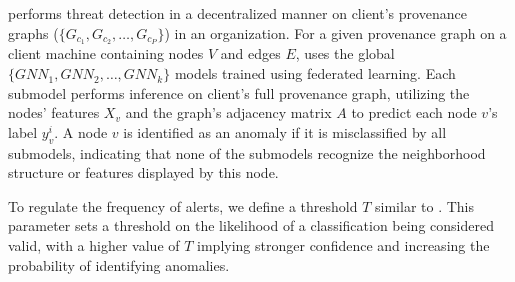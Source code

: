 \Sys performs threat detection in a decentralized manner on client's provenance graphs (\( \{G_{c_1}, G_{c_2}, \ldots, G_{c_P}\} \)) in an organization. For a given provenance graph on a client machine containing nodes \(V\) and edges \(E\), \Sys uses the global \(\{GNN_1, GNN_2, \ldots, GNN_k\}\) \gnnshort models trained using federated learning. Each submodel performs inference on client's full provenance graph, utilizing the nodes' features \(X_v\) and the graph's adjacency matrix \(A\) to predict each node \(v\)'s label \(y_v^i\). A node \(v\) is identified as an anomaly if it is misclassified by all submodels, indicating that none of the submodels recognize the neighborhood structure or features displayed by this node. 

To regulate the frequency of alerts, we define a threshold \(T\) similar to \flash. This parameter sets a threshold on the likelihood of a classification being considered valid, with a higher value of \(T\) implying stronger confidence and increasing the probability of identifying anomalies. 